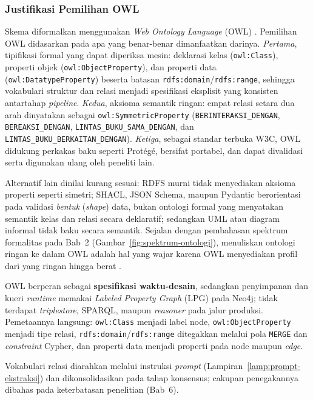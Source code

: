 \documentclass[../../thesis]{subfiles}
\begin{document}


\subsubsection{Justifikasi Pemilihan OWL}

Skema diformalkan menggunakan \textit{Web Ontology Language} (OWL)
\parencite{w3c_owl2_2012}. Pemilihan OWL didasarkan pada apa yang
benar-benar dimanfaatkan darinya. \emph{Pertama}, tipifikasi formal yang dapat
diperiksa mesin: deklarasi kelas (\texttt{owl:Class}), properti objek
(\texttt{owl:ObjectProperty}), dan properti data
(\texttt{owl:DatatypeProperty}) beserta batasan
\texttt{rdfs:domain}/\texttt{rdfs:range}, sehingga vokabulari struktur dan
relasi menjadi spesifikasi eksplisit yang konsisten antartahap
\textit{pipeline}. \emph{Kedua}, aksioma semantik ringan: empat relasi setara dua arah
dinyatakan sebagai \texttt{owl:SymmetricProperty}
(\texttt{BERINTERAKSI\_DENGAN}, \texttt{BEREAKSI\_DENGAN},
\texttt{LINTAS\_BUKU\_SAMA\_DENGAN}, dan
\texttt{LINTAS\_BUKU\_BERKAITAN\_DENGAN}). \emph{Ketiga}, sebagai standar terbuka
W3C, OWL didukung perkakas baku seperti Prot\'eg\'e, bersifat portabel, dan
dapat divalidasi serta digunakan ulang oleh peneliti lain.

Alternatif lain dinilai kurang sesuai: RDFS murni tidak menyediakan aksioma
properti seperti simetri; SHACL, JSON Schema, maupun Pydantic berorientasi pada
validasi \textit{bentuk} (\textit{shape}) data, bukan ontologi formal yang
menyatakan semantik kelas dan relasi secara deklaratif; sedangkan UML atau
diagram informal tidak baku secara semantik. Sejalan dengan pembahasan spektrum
formalitas pada Bab~2 (Gambar~\ref{fig:spektrum-ontologi}), menuliskan ontologi
ringan ke dalam OWL adalah hal yang wajar karena OWL menyediakan profil dari
yang ringan hingga berat \parencite{w3c_owl2_profiles_2012}.

OWL berperan sebagai \textbf{spesifikasi waktu-desain}, sedangkan penyimpanan
dan kueri \textit{runtime} memakai \textit{Labeled Property Graph} (LPG) pada
Neo4j; tidak terdapat \textit{triplestore}, SPARQL, maupun \textit{reasoner}
pada jalur produksi. Pemetaannya langsung: \texttt{owl:Class} menjadi label
node, \texttt{owl:ObjectProperty} menjadi tipe relasi,
\texttt{rdfs:domain}/\texttt{rdfs:range} ditegakkan melalui pola \texttt{MERGE}
dan \textit{constraint} Cypher, dan properti data menjadi properti pada node
maupun \textit{edge}.

Vokabulari relasi diarahkan melalui instruksi \textit{prompt}
(Lampiran~\ref{lamp:prompt-ekstraksi}) dan dikonsolidasikan pada tahap
konsensus; cakupan penegakannya dibahas pada keterbatasan penelitian (Bab~6).
\end{document}

